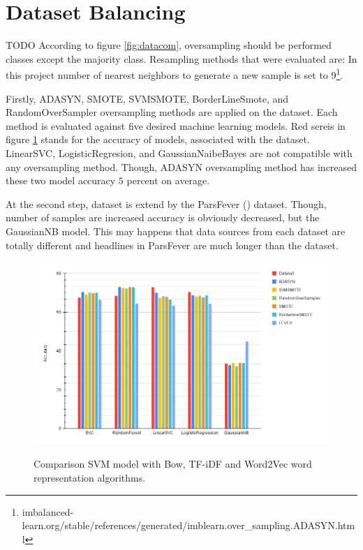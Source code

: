 \section{Dataset Balancing}
{\color{green} TODO}
According to figure \ref{fig:datacom}, oversampling should be performed classes except the majority class. Resampling methods that were evaluated are:
In this project number of nearest neighbors to generate a new sample is set to 9\footnote{imbalanced-learn.org/stable/references/generated/imblearn.over\_sampling.ADASYN.html}.


Firstly, ADASYN, SMOTE, SVMSMOTE, BorderLineSmote, and RandomOverSampler oversampling methods are applied on the \cite{stance_persian} dataset. Each method is evaluated against five desired machine learning models. Red sereis in figure \ref{fig:balanc} stands for the accuracy of models, associated with the \cite{stance_persian} dataset. LinearSVC, LogisticRegresion, and GaussianNaibeBayes are not compatible with any oversampling method. Though, ADASYN oversampling method has increased these two model accuracy $5$ percent on average. 

At the second step, dataset is extend by the ParsFever (\cite{parsfever}) dataset. Though, number of samples are increased accuracy is obviously decreased, but the GaussianNB model. This may happens that data sources from each dataset are totally different and headlines in ParsFever are much longer than the \cite{stance_persian} dataset.
\begin{figure}%
	\centering
	{\includegraphics[width=14.5cm]{statistics/balancing.png} }
	\caption{Comparison SVM model with Bow, TF-iDF and Word2Vec word representation algorithms.}%
	\label{fig:balanc}%
\end{figure}

